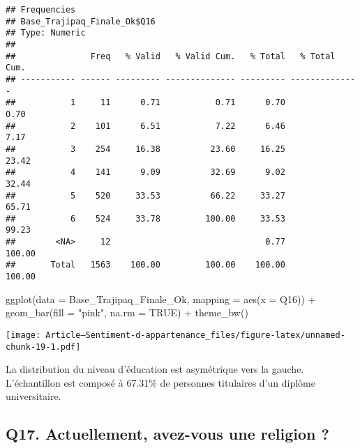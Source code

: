 \documentclass[
]{article}
\newenvironment{Shaded}{\begin{snugshade}}{\end{snugshade}}
\newcommand{\AttributeTok}[1]{\textcolor[rgb]{0.77,0.63,0.00}{#1}}
\newcommand{\ConstantTok}[1]{\textcolor[rgb]{0.00,0.00,0.00}{#1}}
\newcommand{\FunctionTok}[1]{\textcolor[rgb]{0.00,0.00,0.00}{#1}}
\newcommand{\NormalTok}[1]{#1}
\newcommand{\SpecialCharTok}[1]{\textcolor[rgb]{0.00,0.00,0.00}{#1}}
\newcommand{\StringTok}[1]{\textcolor[rgb]{0.31,0.60,0.02}{#1}}
\begin{document}
\begin{Shaded}
\end{Shaded}

\begin{verbatim}
## Frequencies  
## Base_Trajipaq_Finale_Ok$Q16  
## Type: Numeric  
## 
##               Freq   % Valid   % Valid Cum.   % Total   % Total Cum.
## ----------- ------ --------- -------------- --------- --------------
##           1     11      0.71           0.71      0.70           0.70
##           2    101      6.51           7.22      6.46           7.17
##           3    254     16.38          23.60     16.25          23.42
##           4    141      9.09          32.69      9.02          32.44
##           5    520     33.53          66.22     33.27          65.71
##           6    524     33.78         100.00     33.53          99.23
##        <NA>     12                               0.77         100.00
##       Total   1563    100.00         100.00    100.00         100.00
\end{verbatim}

\begin{Shaded}
\begin{Highlighting}[]
\FunctionTok{ggplot}\NormalTok{(}\AttributeTok{data =}\NormalTok{ Base\_Trajipaq\_Finale\_Ok, }\AttributeTok{mapping =} \FunctionTok{aes}\NormalTok{(}\AttributeTok{x =}\NormalTok{ Q16)) }\SpecialCharTok{+}
  \FunctionTok{geom\_bar}\NormalTok{(}\AttributeTok{fill =} \StringTok{"pink"}\NormalTok{, }\AttributeTok{na.rm =} \ConstantTok{TRUE}\NormalTok{) }\SpecialCharTok{+}
  \FunctionTok{theme\_bw}\NormalTok{()}
\end{Highlighting}
\end{Shaded}

\texttt{[image: Article---Sentiment-d-appartenance\_files/figure-latex/unnamed-chunk-19-1.pdf]}

La distribution du niveau d'éducation est asymétrique vers la gauche.
L'échantillon est composé à 67.31\% de personnes titulaires d'un diplôme
universitaire.

\hypertarget{q17.-actuellement-avez-vous-une-religion}{%
\subsection{Q17. Actuellement, avez-vous une religion
?}\label{q17.-actuellement-avez-vous-une-religion}}
\end{document}
